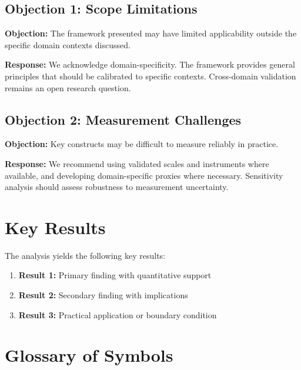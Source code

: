 \subsection{Objection 1: Scope Limitations}

\textbf{Objection:} The framework presented may have limited applicability
outside the specific domain contexts discussed.

\textbf{Response:} We acknowledge domain-specificity. The framework provides
general principles that should be calibrated to specific contexts. Cross-domain
validation remains an open research question.

\subsection{Objection 2: Measurement Challenges}

\textbf{Objection:} Key constructs may be difficult to measure reliably in
practice.

\textbf{Response:} We recommend using validated scales and instruments where
available, and developing domain-specific proxies where necessary. Sensitivity
analysis should assess robustness to measurement uncertainty.





\section{Key Results}
\label{sec:thl-results}

The analysis yields the following key results:

\begin{enumerate}
    \item \textbf{Result 1:} Primary finding with quantitative support
    \item \textbf{Result 2:} Secondary finding with implications
    \item \textbf{Result 3:} Practical application or boundary condition
\end{enumerate}

\section{Glossary of Symbols}
\label{sec:thl-glossary}

